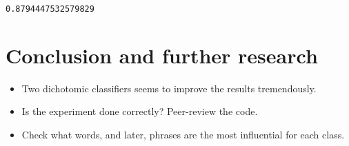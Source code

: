 \documentclass[11pt]{article}
\begin{document}
    \begin{Verbatim}[commandchars=\\\{\}]
0.8794447532579829

    \end{Verbatim}

    \hypertarget{conclusion-and-further-research}{%
\section{Conclusion and further
research}\label{conclusion-and-further-research}}

\begin{itemize}
\item
  Two dichotomic classifiers seems to improve the results tremendously.
\item
  Is the experiment done correctly? Peer-review the code.
\item
  Check what words, and later, phrases are the most influential for each
  class.
\end{itemize}


    
    
    
    
\end{document}

